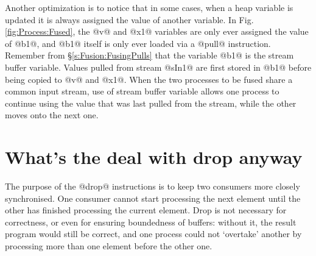 Another optimization is to notice that in some cases, when a heap variable is updated it is always assigned the value of another variable. In Fig.\ref{fig:Process:Fused}, the @v@ and @x1@ variables are only ever assigned the value of @b1@, and @b1@ itself is only ever loaded via a @pull@ instruction. Remember from \S\ref{s:Fusion:FusingPulls} that the variable @b1@ is the stream buffer variable. Values pulled from stream @sIn1@ are first stored in @b1@ before being copied to @v@ and @x1@. When the two processes to be fused share a common input stream, use of stream buffer variable allows one process to continue using the value that was last pulled from the stream, while the other moves onto the next one. 



\section{What's the deal with drop anyway}

The purpose of the @drop@ instructions is to keep two consumers more closely synchronised.
One consumer cannot start processing the next element until the other has finished processing the current element.
Drop is not necessary for correctness, or even for ensuring boundedness of buffers: without it, the result program would still be correct, and one process could not `overtake' another by processing more than one element before the other one.

